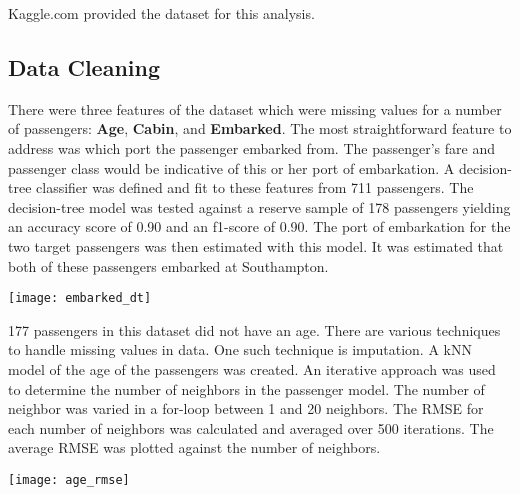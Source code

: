 \documentclass[10pt]{article}
\begin{document}
\begin{multicols}{2}
	Kaggle.com provided the dataset for this analysis.

\subsection{Data Cleaning}
	

	There were three features of the dataset which were missing values for a number of passengers: \textbf{Age}, \textbf{Cabin}, and \textbf{Embarked}.
	The most straightforward feature to address was which port the passenger embarked from.
	The passenger's fare and passenger class would be indicative of this or her port of embarkation.
	A decision-tree classifier was defined and fit to these features from 711 passengers.
	The decision-tree model was tested against a reserve sample of 178 passengers yielding an accuracy score of 0.90 and an f1-score of 0.90.
	The port of embarkation for the two target passengers was then estimated with this model.
	It was estimated that both of these passengers embarked at Southampton.\\
	\begin{center}
	\texttt{[image: embarked\_dt]}\\
	\end{center}

	177 passengers in this dataset did not have an age.
	There are various techniques to handle missing values in data.
	One such technique is imputation.
	A kNN model of the age of the passengers was created.
	An iterative approach was used to determine the number of neighbors in the passenger model.
	The number of neighbor was varied in a for-loop between 1 and 20 neighbors.
	The RMSE for each number of neighbors was calculated and averaged over 500 iterations.
	The average RMSE was plotted against the number of neighbors.
	\begin{center}	
	\texttt{[image: age\_rmse]}\\
	\end{center}


\end{multicols}
\end{document}
